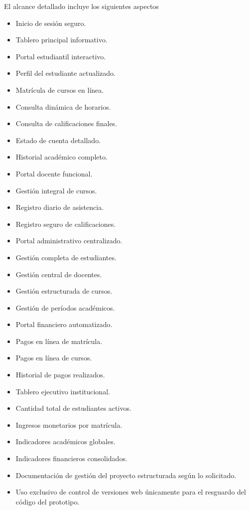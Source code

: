 \documentclass[11pt,spanish]{article}
\begin{document}
El alcance detallado incluye los siguientes aspectos

\begin{itemize}
    \item Inicio de sesión seguro.
    \item Tablero principal informativo.
    \item Portal estudiantil interactivo.
    \item Perfil del estudiante actualizado.
    \item Matrícula de cursos en línea.
    \item Consulta dinámica de horarios.
    \item Consulta de calificaciones finales.
    \item Estado de cuenta detallado.
    \item Historial académico completo.
    \item Portal docente funcional.
    \item Gestión integral de cursos.
    \item Registro diario de asistencia.
    \item Registro seguro de calificaciones.
    \item Portal administrativo centralizado.
    \item Gestión completa de estudiantes.
    \item Gestión central de docentes.
    \item Gestión estructurada de cursos.
    \item Gestión de períodos académicos.
    \item Portal financiero automatizado.
    \item Pagos en línea de matrícula.
    \item Pagos en línea de cursos.
    \item Historial de pagos realizados.
    \item Tablero ejecutivo institucional.
    \item Cantidad total de estudiantes activos.
    \item Ingresos monetarios por matrícula.
    \item Indicadores académicos globales.
    \item Indicadores financieros consolidados.
    \item Documentación de gestión del proyecto estructurada según lo solicitado.
    \item Uso exclusivo de control de versiones web únicamente para el resguardo del código del prototipo.
\end{itemize}
\end{document}
